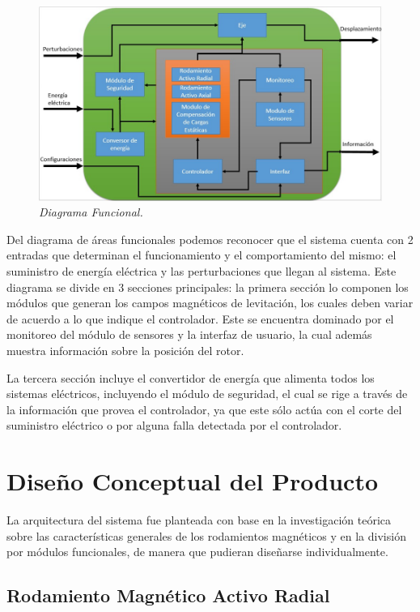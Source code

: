 \begin{figure}[htb]
\centering
	\includegraphics[width=\textwidth]{images/Capitulo_2/DiagramaFuncional}
	\caption{\textit{Diagrama Funcional.}}
	\label{fig:system:example1}
\end{figure}

Del diagrama de áreas funcionales podemos reconocer que el sistema cuenta con 2 entradas que determinan el funcionamiento y el comportamiento del mismo: el suministro de energía eléctrica y las perturbaciones que llegan al sistema. Este diagrama se divide en 3 secciones principales: la primera sección lo componen los módulos que generan los campos magnéticos de levitación, los cuales deben variar de acuerdo a lo que indique el controlador. Este se encuentra dominado por el monitoreo del módulo de sensores y la interfaz de usuario, la cual además muestra información sobre la posición del rotor. 

La tercera sección incluye el convertidor de energía que alimenta todos los sistemas eléctricos, incluyendo el módulo de seguridad, el cual se rige a través de la información que provea el controlador, ya que este sólo actúa con el corte del suministro eléctrico o por alguna falla detectada por el controlador. 


\section{Diseño Conceptual del Producto}
\label{sec:system:sec4}

La arquitectura del sistema fue planteada con base en la investigación teórica sobre las características generales de los rodamientos magnéticos y en la división por módulos funcionales, de manera que pudieran diseñarse individualmente. 

\subsection{Rodamiento Magnético Activo Radial}

